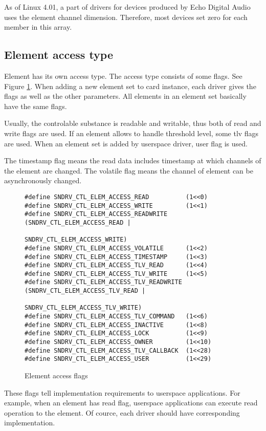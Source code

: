 \documentclass[onecolumn]{article}
\begin{document}
As of Linux 4.01, a part of drivers for devices produced by Echo Digital Audio uses the element channel dimension. Therefore, most devices set zero for each member in this array.


\subsection{Element access type}

Element has its own access type. The access type consists of some flags. See Figure \ref{fig:element-access-flags}. When adding a new element set to card instance, each driver gives the flags as well as the other parameters. All elements in an element set basically have the same flags.

Usually, the controlable substance is readable and writable, thus both of read and write flags are used. If an element allows to handle threshold level, some tlv flags are used. When an element set is added by userspace driver, user flag is used.

The timestamp flag means the read data includes timestamp at which channels of the element are changed. The volatile flag means the channel of element can be asynchronously changed.

\begin{figure}[htbp]
\small
\begin{verbatim}
#define SNDRV_CTL_ELEM_ACCESS_READ          (1<<0)
#define SNDRV_CTL_ELEM_ACCESS_WRITE         (1<<1)
#define SNDRV_CTL_ELEM_ACCESS_READWRITE     (SNDRV_CTL_ELEM_ACCESS_READ |
                                             SNDRV_CTL_ELEM_ACCESS_WRITE)
#define SNDRV_CTL_ELEM_ACCESS_VOLATILE      (1<<2)
#define SNDRV_CTL_ELEM_ACCESS_TIMESTAMP     (1<<3)
#define SNDRV_CTL_ELEM_ACCESS_TLV_READ      (1<<4)
#define SNDRV_CTL_ELEM_ACCESS_TLV_WRITE     (1<<5)
#define SNDRV_CTL_ELEM_ACCESS_TLV_READWRITE (SNDRV_CTL_ELEM_ACCESS_TLV_READ |
                                             SNDRV_CTL_ELEM_ACCESS_TLV_WRITE)
#define SNDRV_CTL_ELEM_ACCESS_TLV_COMMAND   (1<<6)
#define SNDRV_CTL_ELEM_ACCESS_INACTIVE      (1<<8)
#define SNDRV_CTL_ELEM_ACCESS_LOCK          (1<<9)
#define SNDRV_CTL_ELEM_ACCESS_OWNER         (1<<10)
#define SNDRV_CTL_ELEM_ACCESS_TLV_CALLBACK  (1<<28)
#define SNDRV_CTL_ELEM_ACCESS_USER          (1<<29)
\end{verbatim}
\caption{{Element access flags}}
\label{fig:element-access-flags}
\end{figure}

These flags tell implementation requirements to userspace applications. For example, when an element has read flag, userspace applications can execute read operation to the element. Of cource, each driver should have corresponding implementation.
\end{document}
